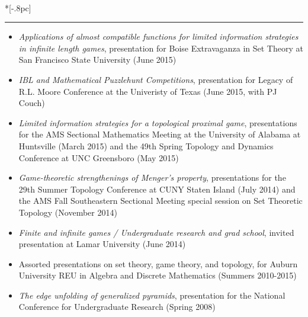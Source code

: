 \documentclass{article}
\newcommand{\headerText}[1]{
  \noindent{\large \bf #1} \\*[-.8pc]
  \rule{\textwidth}{.1pt}}
\begin{document}
\vfill


\headerText{Selected Presentations}
\begin{itemize}
  \item
    \emph{Applications of almost compatible functions for limited information strategies in infinite length games},
    presentation for
      Boise Extravaganza in Set Theory at San Francisco State University
      (June 2015)
  \item
    \emph{IBL and Mathematical Puzzlehunt Competitions},
    presentation for
      Legacy of R.L. Moore Conference at the Univeristy of Texas
      (June 2015, with PJ Couch)
  \item
    \emph{Limited information strategies for a topological proximal game},
    presentations for
      the AMS Sectional Mathematics Meeting at the University of
      Alabama at Huntsville (March 2015) and
      the 49th Spring Topology and Dynamics Conference at
      UNC Greensboro (May 2015)
  \item
    \emph{Game-theoretic strengthenings of Menger's property},
    presentations for
      the 29th Summer Topology Conference at CUNY Staten Island (July 2014) and
      the AMS Fall Southeastern Sectional Meeting special session on Set
      Theoretic Topology (November 2014)
  \item
    \emph{Finite and infinite games / Undergraduate research and grad school},
    invited presentation at Lamar University (June 2014)
  \item
    Assorted presentations on set theory, game theory, and topology,
    for Auburn University REU in Algebra and Discrete Mathematics
      (Summers 2010-2015)
  \item
    \emph{The edge unfolding of generalized pyramids},
    presentation for the National Conference for Undergraduate Research
      (Spring 2008)
\end{itemize}
\end{document}
